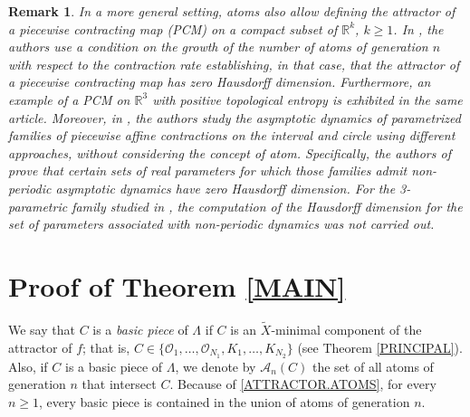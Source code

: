 \documentclass[a4paper]{article}
\newtheorem{remark}[theorem]{Remark}
\begin{document}
\begin{remark}
    In a more general setting, atoms also allow defining the attractor of a piecewise contracting map (PCM) on a compact subset of $\mathbb R^k$, $k\geq1$. In \cite{CGMU16}, {the authors use a condition on the growth of the number of atoms of generation $n$ with respect to the contraction rate establishing, in that case, that the attractor of a piecewise contracting map has zero Hausdorff dimension}. Furthermore, an example of a PCM on $\mathbb R^3$ with positive topological entropy is exhibited in the same article. {Moreover, in \cite{G22,GN22,JO19,LN18,LN21}, the authors study the asymptotic dynamics of parametrized fa\-mi\-lies of piecewise affine contractions on the interval and circle using different approaches, without considering the concept of atom. Specifically, the authors of \cite{G22,GN22,JO19,LN18} prove that certain sets of real parameters for which those families admit non-periodic asymptotic dynamics have zero Hausdorff dimension. For the 3-parametric family studied in \cite{LN21}, the computation of the Hausdorff dimension for the set of parameters associated with non-periodic dynamics was not carried out.
    }
\end{remark}


\section{Proof of Theorem \ref{MAIN}}

We say that $C$ is a {\em basic piece} of $\Lambda$ if $C$ is an $\widetilde X$-minimal component of the attractor of $f$; that is, $C\in\{\mathcal O_1,\ldots,\mathcal O_{N_1},K_1,\ldots,K_{N_2}\}$ (see Theorem \ref{PRINCIPAL}). Also, if $C$ is a {basic piece} of $\Lambda$, we denote by $\mathcal A_n(C)$ the set of all atoms of generation $n$ that intersect $C$. Because of \eqref{ATTRACTOR.ATOMS}, for every $n\geq1$, every basic piece is contained in the union of atoms of generation $n$.
\end{document}
